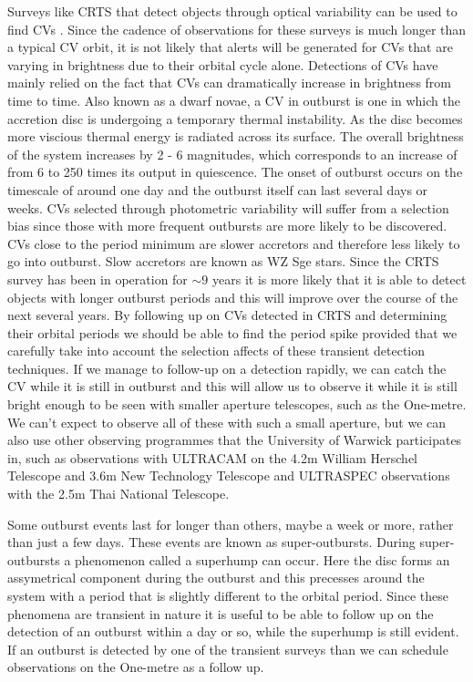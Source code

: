 \documentclass[a4paper,fleqn,usenatbib]{mnras}
\begin{document}
Surveys like CRTS that detect objects through optical variability can be used to find CVs \citep{Breedt2014}. Since the cadence of observations for these surveys is much longer than a typical CV orbit, it is not likely that alerts will be generated for CVs that are varying in brightness due to their orbital cycle alone. Detections of CVs have mainly relied on the fact that CVs can dramatically increase in brightness from time to time. Also known as a dwarf novae, a CV in outburst is one in which the accretion disc is undergoing a temporary thermal instability. As the disc becomes more viscious thermal energy is radiated across its surface. The overall brightness of the system increases by 2 - 6 magnitudes, which corresponds to an increase of from 6 to 250 times its output in quiescence.  The onset of outburst occurs on the timescale of around one day and the outburst itself can last several days or weeks. CVs selected through photometric variability will suffer from a selection bias since those with more frequent outbursts are more likely to be discovered. CVs close to the period minimum are slower accretors and therefore less likely to go into outburst. Slow accretors are known as WZ Sge stars. Since the CRTS survey has been in operation for $\sim 9$ years it is more likely that it is able to detect objects with longer outburst periods and this will improve over the course of the next several years. By following up on CVs detected in CRTS and determining their orbital periods we should be able to find the period spike provided that we carefully take into account the selection affects of these transient detection techniques. If we manage to follow-up on a detection rapidly, we can catch the CV while it is still in outburst and this will allow us to observe it while it is still bright enough to be seen with smaller aperture telescopes, such as the One-metre. We can't expect to observe all of these with such a small aperture, but we can also use other observing programmes that the University of Warwick participates in, such as observations with ULTRACAM on the 4.2m William Herschel Telescope and 3.6m New Technology Telescope and ULTRASPEC observations with the 2.5m Thai National Telescope. 

Some outburst events last for longer than others, maybe a week or more, rather than just a few days. These events are known as super-outbursts. During super-outbursts a phenomenon called a superhump can occur. Here the disc forms an assymetrical component during the outburst and this precesses around the system with a period that is slightly different to the orbital period. Since these phenomena are transient in nature it is useful to be able to follow up on the detection of an outburst within a day or so, while the superhump is still evident. If an outburst is detected by one of the transient surveys than we can schedule observations on the One-metre as a follow up. 
\end{document}
